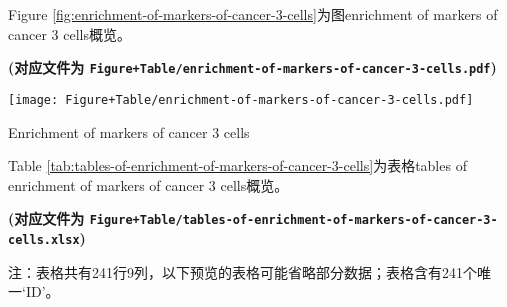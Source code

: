 \documentclass[
]{article}
\begin{document}
Figure \ref{fig:enrichment-of-markers-of-cancer-3-cells}为图enrichment of markers of cancer 3 cells概览。

\textbf{(对应文件为 \texttt{Figure+Table/enrichment-of-markers-of-cancer-3-cells.pdf})}

\def\@captype{figure}
\begin{center}
\texttt{[image: Figure+Table/enrichment-of-markers-of-cancer-3-cells.pdf]}
\caption{Enrichment of markers of cancer 3 cells}\label{fig:enrichment-of-markers-of-cancer-3-cells}
\end{center}

Table \ref{tab:tables-of-enrichment-of-markers-of-cancer-3-cells}为表格tables of enrichment of markers of cancer 3 cells概览。

\textbf{(对应文件为 \texttt{Figure+Table/tables-of-enrichment-of-markers-of-cancer-3-cells.xlsx})}

\begin{center}\begin{tcolorbox}[colback=gray!10, colframe=gray!50, width=0.9\linewidth, arc=1mm, boxrule=0.5pt]注：表格共有241行9列，以下预览的表格可能省略部分数据；表格含有241个唯一`ID'。
\end{tcolorbox}
\end{center}
\end{document}
